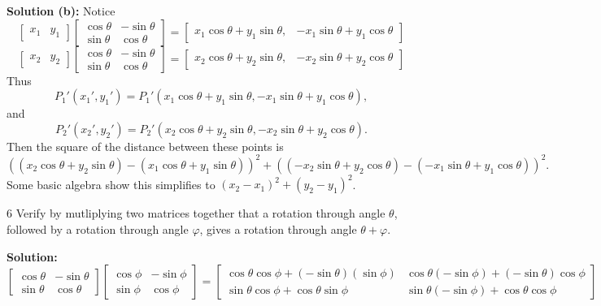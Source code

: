 \textbf{Solution (b):}
Notice 
\[
    \begin{bmatrix}x_1 & y_1\end{bmatrix}
    \begin{bmatrix}
                   \cos \theta & -\sin \theta \\
                   \sin \theta & \cos \theta
    \end{bmatrix} = 
    \begin{bmatrix}
     x_1 \cos\theta + y_1 \sin\theta, &
    -x_1 \sin\theta + y_1 \cos\theta
    \end{bmatrix}
\]
\[
    \begin{bmatrix}x_2 & y_2\end{bmatrix}
    \begin{bmatrix}
                   \cos \theta & -\sin \theta \\
                   \sin \theta & \cos \theta
    \end{bmatrix} = 
    \begin{bmatrix}
     x_2 \cos\theta + y_2 \sin\theta, &
    -x_2 \sin\theta + y_2 \cos\theta
    \end{bmatrix}
\]
Thus 
\[P_1'(x_1', y_1') = P_1'(x_1 \cos\theta + y_1 \sin\theta, -x_1 \sin\theta + y_1 \cos\theta),\]
and 
\[P_2'(x_2', y_2') = P_2'(x_2 \cos\theta + y_2 \sin\theta, -x_2 \sin\theta + y_2 \cos\theta).\]
Then the square of the distance between these points is 
\[((x_2 \cos\theta + y_2 \sin\theta) - (x_1 \cos\theta + y_1 \sin\theta))^2 
    + ((-x_2 \sin\theta + y_2 \cos\theta) - (-x_1 \sin\theta + y_1 \cos\theta))^2.\]
Some basic algebra show this simplifies to $(x_2 - x_1)^2 + (y_2 - y_1)^2$.

\begin{problem}{6}
    Verify by mutliplying two matrices together that a 
    rotation through angle $\theta$, followed by a 
    rotation through angle $\varphi$, gives a rotation through 
    angle $\theta + \varphi$.
\end{problem}
\solved

\textbf{Solution:}
\[
\begin{bmatrix}
\cos \theta & -\sin \theta \\
\sin \theta & \cos \theta
\end{bmatrix}
\begin{bmatrix}
\cos \phi & -\sin \phi \\
\sin \phi & \cos \phi
\end{bmatrix}
=
\begin{bmatrix}
\cos\theta \cos\phi + (-\sin\theta)(\sin\phi) & \cos\theta(-\sin\phi) + (-\sin\theta)\cos\phi \\
\sin\theta \cos\phi + \cos\theta \sin\phi & \sin\theta(-\sin\phi) + \cos\theta \cos\phi
\end{bmatrix}
\]


